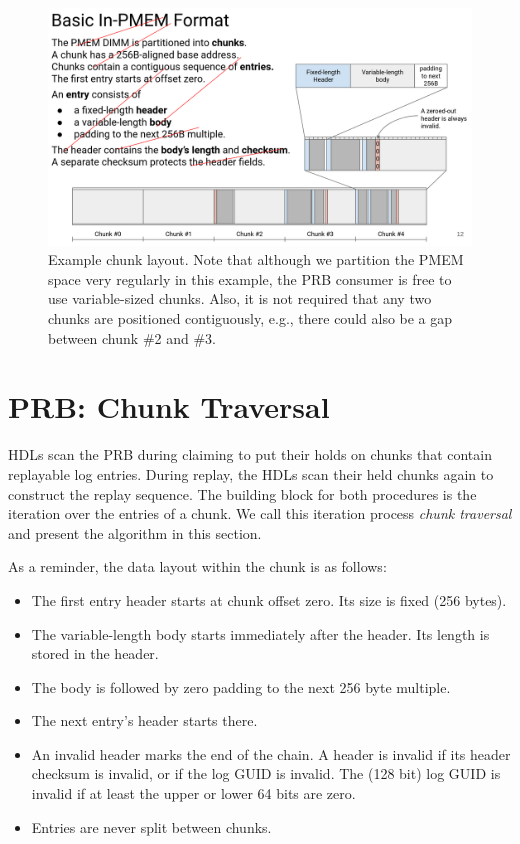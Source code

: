 \documentclass[12pt,a4paper,twoside]{book}
\begin{document}
\begin{figure}[H]
    \centering
    \includegraphics{fig/prb_persistent_structure__chunklayout}
    \caption{Example chunk layout. Note that although we partition the PMEM space very regularly in this example, the PRB consumer is free to use variable-sized chunks.
        Also, it is not required that any two chunks are positioned contiguously, e.g., there could also be a gap between chunk \#2 and \#3.}
    \label{fig:prb_physical_data_structure__chunklayout}
\end{figure}


\section{PRB: Chunk Traversal}\label{di:prb:traversal}
HDLs scan the PRB during claiming to put their holds on chunks that contain replayable log entries.
During replay, the HDLs scan their held chunks again to construct the replay sequence.
The building block for both procedures is the iteration over the entries of a chunk.
We call this iteration process \textit{chunk traversal} and present the algorithm in this section.

As a reminder, the data layout within the chunk is as follows:
\begin{itemize}[noitemsep]
    \item The first entry header starts at chunk offset zero. Its size is fixed (256 bytes).
    \item The variable-length body starts immediately after the header. Its length is stored in the header.
    \item The body is followed by zero padding to the next 256 byte multiple.
    \item The next entry's header starts there.
    \item An invalid header marks the end of the chain.
        A header is invalid if its header checksum is invalid, or if the log GUID is invalid.
        The (128 bit) log GUID is invalid if at least the upper or lower 64 bits are zero.
    \item Entries are never split between chunks.
\end{itemize}
\end{document}
